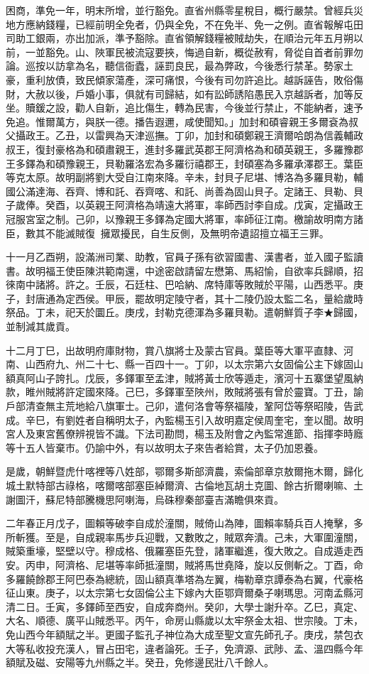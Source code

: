 \begin{pinyinscope}
困商，準免一年，明末所增，並行豁免。直省州縣零星稅目，概行嚴禁。曾經兵災地方應納錢糧，已經前明全免者，仍與全免，不在免半、免一之例。直省報解屯田司助工銀兩，亦出加派，準予豁除。直省領解錢糧被賊劫失，在順治元年五月朔以前，一並豁免。山、陜軍民被流寇要挾，悔過自新，概從赦宥，脅從自首者前罪勿論。巡按以訪拿為名，聽信衙蠹，誣罰良民，最為弊政，今後悉行禁革。勢家土豪，重利放債，致民傾家蕩產，深可痛恨，今後有司勿許追比。越訴誣告，敗俗傷財，大赦以後，戶婚小事，俱就有司歸結，如有訟師誘陷愚民入京越訴者，加等反坐。贖鍰之設，勸人自新，追比傷生，轉為民害，今後並行禁止，不能納者，速予免追。惟爾萬方，與朕一德。播告遐邇，咸使聞知。」加封和碩睿親王多爾袞為叔父攝政王。乙丑，以雷興為天津巡撫。丁卯，加封和碩鄭親王濟爾哈朗為信義輔政叔王，復封豪格為和碩肅親王，進封多羅武英郡王阿濟格為和碩英親王，多羅豫郡王多鐸為和碩豫親王，貝勒羅洛宏為多羅衍禧郡王，封碩塞為多羅承澤郡王。葉臣等克太原。故明副將劉大受自江南來降。辛未，封貝子尼堪、博洛為多羅貝勒，輔國公滿達海、吞齊、博和託、吞齊喀、和託、尚善為固山貝子。定諸王、貝勒、貝子歲俸。癸酉，以英親王阿濟格為靖遠大將軍，率師西討李自成。戊寅，定攝政王冠服宮室之制。己卯，以豫親王多鐸為定國大將軍，率師征江南。檄諭故明南方諸臣，數其不能滅賊復，擁眾擾民，自生反側，及無明帝遺詔擅立福王三罪。

十一月乙酉朔，設滿洲司業、助教，官員子孫有欲習國書、漢書者，並入國子監讀書。故明福王使臣陳洪範南還，中途密啟請留左懋第、馬紹愉，自欲率兵歸順，招徠南中諸將。許之。壬辰，石廷柱、巴哈納、席特庫等敗賊於平陽，山西悉平。庚子，封唐通為定西侯。甲辰，罷故明定陵守者，其十二陵仍設太監二名，量給歲時祭品。丁未，祀天於圜丘。庚戌，封勒克德渾為多羅貝勒。遣朝鮮質子李★歸國，並制減其歲貢。

十二月丁巳，出故明府庫財物，賞八旗將士及蒙古官員。葉臣等大軍平直隸、河南、山西府九、州二十七、縣一百四十一。丁卯，以太宗第六女固倫公主下嫁固山額真阿山子誇扎。戊辰，多鐸軍至孟津，賊將黃士欣等遁走，濱河十五寨堡望風納款，睢州賊將許定國來降。己巳，多鐸軍至陜州，敗賊將張有曾於靈寶。丁丑，諭戶部清查無主荒地給八旗軍士。己卯，遣何洛會等祭福陵，鞏阿岱等祭昭陵，告武成。辛巳，有劉姓者自稱明太子，內監楊玉引入故明嘉定侯周奎宅，奎以聞。故明宮人及東宮舊僚辨視皆不識。下法司勘問，楊玉及附會之內監常進節、指揮李時廕等十五人皆棄市。仍諭中外，有以故明太子來告者給賞，太子仍加恩養。

是歲，朝鮮暨虎什喀裡等八姓部，鄂爾多斯部濟農，索倫部章京敖爾拖木爾，歸化城土默特部古祿格，喀爾喀部塞臣綽爾濟、古倫地瓦胡土克圖、餘古折爾喇嘛、土謝圖汗，蘇尼特部騰機思阿喇海，烏硃穆秦部臺吉滿瞻俱來貢。

二年春正月戊子，圖賴等破李自成於潼關，賊倚山為陣，圖賴率騎兵百人掩擊，多所斬獲。至是，自成親率馬步兵迎戰，又數敗之，賊眾奔潰。己未，大軍圍潼關，賊築重壕，堅壁以守。穆成格、俄羅塞臣先登，諸軍繼進，復大敗之。自成遁走西安。丙申，阿濟格、尼堪等率師抵潼關，賊將馬世堯降，旋以反側斬之。丁酉，命多羅饒餘郡王阿巴泰為總統，固山額真準塔為左翼，梅勒章京譚泰為右翼，代豪格征山東。庚子，以太宗第七女固倫公主下嫁內大臣鄂齊爾桑子喇瑪思。河南孟縣河清二日。壬寅，多鐸師至西安，自成奔商州。癸卯，大學士謝升卒。乙巳，真定、大名、順德、廣平山賊悉平。丙午，命房山縣歲以太牢祭金太祖、世宗陵。丁未，免山西今年額賦之半。更國子監孔子神位為大成至聖文宣先師孔子。庚戌，禁包衣大等私收投充漢人，冒占田宅，違者論死。壬子，免濟源、武陟、孟、溫四縣今年額賦及磁、安陽等九州縣之半。癸丑，免修邊民壯八千餘人。


\end{pinyinscope}
